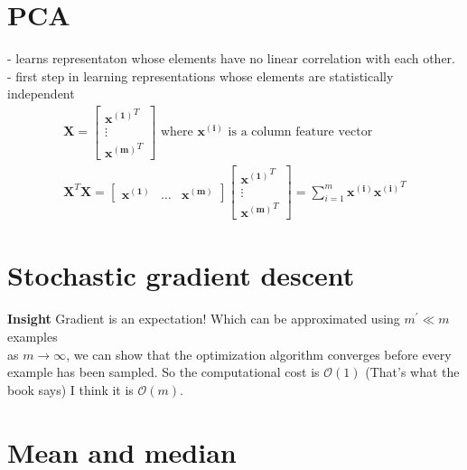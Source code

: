 \documentclass{article}
\newcommand{\ber}{\begin{eqnarray}}
\newcommand{\eer}{\end{eqnarray}}
\begin{document}
\section{PCA}
- learns representaton whose elements have no linear correlation with each other.\\
- first step in learning representations whose elements are statistically independent\\
\ber
\pmb{X} = \begin{bmatrix}\pmb{x^{(1)}}^T\\\vdots\\\pmb{x^{(m)}}^T\end{bmatrix} \text{ where } \pmb{x^{(i)}} \text{ is a column feature vector}\\
\pmb{X}^T\pmb{X} = \begin{bmatrix}\pmb{x^{(1)}}& \hdots & \pmb{x^{(m)}}\end{bmatrix}\begin{bmatrix}\pmb{x^{(1)}}^T\\\vdots\\\pmb{x^{(m)}}^T\end{bmatrix} = \sum_{i=1}^{m}\pmb{x^{(i)}}\pmb{x^{(i)}}^T
  \eer
\section{Stochastic gradient descent}
\textbf{Insight} Gradient is an expectation! Which can be approximated using $m^{'}\ll{m}$ examples\\
as $m\rightarrow\infty$, we can show that the optimization algorithm converges before every example has been sampled. So the computational cost is $\mathcal{O}(1)$ (That's what the book says) I think it is $\mathcal{O}(m)$.
%
%
%
\section{Mean and median}
\end{document}
